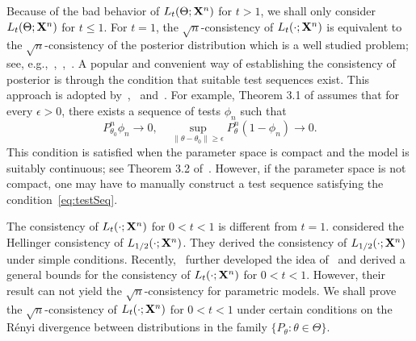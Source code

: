 \documentclass[11pt]{article}
\theoremstyle{plain}
\newtheorem{proposition}{\quad\quad Proposition}
\theoremstyle{definition}
\theoremstyle{remark}
\begin{document}

Because of the bad behavior of $L_t(\Theta;\mathbf{X}^{n})$ for $t>1$, we shall only consider $L_t(\Theta;\mathbf{X}^{n})$ for $t\leq 1$.
For $t=1$, the $\sqrt{n}$-consistency of $L_t(\cdot;\mathbf{X}^{n})$ is equivalent to the $\sqrt{n}$-consistency of the posterior distribution which is a well studied problem; see, e.g.,~\cite{ghosal2000},~\cite{Shen2001Rates},~\cite{vaart2007convergence}.
A popular and convenient way of establishing the consistency of posterior is through the condition that suitable test sequences exist.
This approach is adopted by~\cite{ghosal2000},~\cite{vaart2007convergence} and~\cite{Kleijn2012The}.
For example, Theorem 3.1 of \cite{Kleijn2012The} assumes that for every $\epsilon>0$, there exists a sequence of tests $\phi_n$ such that
\begin{equation}\label{eq:testSeq}
    P_{\theta_0}^n\phi_n\to 0,\quad \sup_{\|\theta-\theta_0\|\geq \epsilon} P_\theta^n(1-\phi_n)\to 0.
\end{equation}
This condition is satisfied when the parameter space is compact and the model is suitably continuous; see Theorem 3.2 of~\cite{Kleijn2012The}.
However, if the parameter space is not compact, one may have to manually construct a test sequence satisfying the condition~\eqref{eq:testSeq}.






The consistency of $L_t(\cdot;\mathbf{X}^{n})$ for $0<t<1$ is different from $t=1$.
\cite{kar10563} considered the Hellinger consistency of $L_{1/2}(\cdot;\mathbf{X}^{n})$.
They derived the consistency of $L_{1/2}(\cdot;\mathbf{X}^{n})$ under simple conditions.
Recently,~\cite{Bha2016} further developed the idea of~\cite{kar10563} and derived a general bounds for the consistency of $L_t(\cdot;\mathbf{X}^{n})$ for $0<t<1$.
However, their result can not yield the $\sqrt{n}$-consistency for parametric models.
We shall prove the $\sqrt{n}$-consistency of $L_{t}(\cdot;\mathbf{X}^{n})$ for $0<t<1$ under certain conditions on the R\'{e}nyi divergence between distributions in the family $\{P_\theta:\theta\in\Theta\}$.
\end{document}
